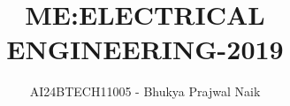 \documentclass[journal]{IEEEtran}
\begin{document}

\vspace{3cm}

\title{ME:ELECTRICAL ENGINEERING-2019}
\author{AI24BTECH11005 - Bhukya Prajwal Naik
}
{\let\newpage\relax\maketitle}

\renewcommand{\thefigure}{\theenumi}
\renewcommand{\thetable}{\theenumi}
\setlength{\intextsep}{10pt} %


\renewcommand{\thetable}{\theenumi}
\end{document}

